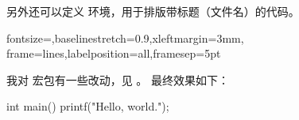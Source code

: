 另外还可以定义 环境，用于排版带标题（文件名）的代码。

\begin{Code}
%
  {fontsize=\small,baselinestretch=0.9,xleftmargin=3mm,%
  frame=lines,labelposition=all,framesep=5pt}
\end{Code}

我对  宏包有一些改动，见 。
最终效果如下：
\begin{Codex}[label=hello.c,numbers=left]
int main()
{
  printf("Hello, world.\n");
}
\end{Codex}
